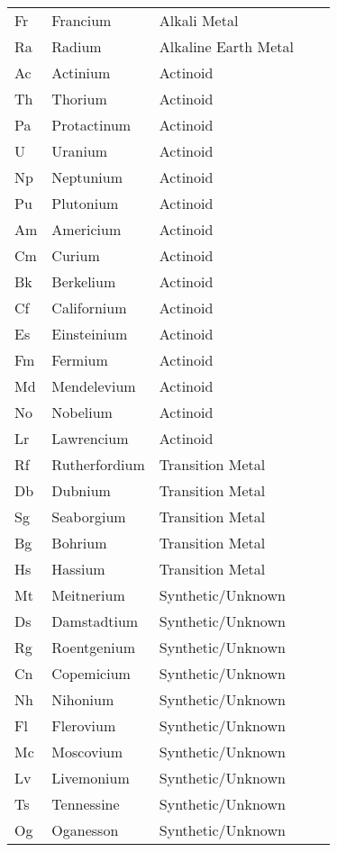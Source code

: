 \begin{center}
\begin{longtable}{|l|l|l|l|l|}
Fr 	& Francium 		& Alkali Metal 						& & \\
Ra 	& Radium 		& Alkaline Earth Metal 				& & \\
Ac 	& Actinium 		& Actinoid 							& & \\
Th 	& Thorium 		& Actinoid 							& & \\
Pa 	& Protactinum	& Actinoid 							& & \\
U 	& Uranium 		& Actinoid 							& & \\
Np 	& Neptunium 	& Actinoid 							& & \\
Pu 	& Plutonium 	& Actinoid 							& & \\
Am 	& Americium 	& Actinoid 							& & \\
Cm 	& Curium 		& Actinoid 							& & \\
Bk 	& Berkelium 	& Actinoid 							& & \\
Cf 	& Californium	& Actinoid 							& & \\
Es 	& Einsteinium	& Actinoid 							& & \\
Fm 	& Fermium 		& Actinoid 							& & \\
Md 	& Mendelevium	& Actinoid 							& & \\
No 	& Nobelium  	& Actinoid 							& & \\
Lr 	& Lawrencium 	& Actinoid 							& & \\
Rf 	& Rutherfordium & Transition Metal 					& & \\
Db 	& Dubnium 		& Transition Metal 					& & \\
Sg 	& Seaborgium 	& Transition Metal 					& & \\
Bg 	& Bohrium 		& Transition Metal 					& & \\
Hs 	& Hassium 		& Transition Metal 					& & \\
Mt 	& Meitnerium 	& Synthetic/Unknown 				& & \\
Ds 	& Damstadtium 	& Synthetic/Unknown 				& & \\
Rg 	& Roentgenium 	& Synthetic/Unknown 				& & \\
Cn 	& Copemicium 	& Synthetic/Unknown 				& & \\
Nh 	& Nihonium 		& Synthetic/Unknown 				& & \\
Fl 	& Flerovium 	& Synthetic/Unknown 				& & \\
Mc 	& Moscovium 	& Synthetic/Unknown 				& & \\
Lv 	& Livemonium 	& Synthetic/Unknown 				& & \\
Ts 	& Tennessine 	& Synthetic/Unknown 				& & \\
Og 	& Oganesson 	& Synthetic/Unknown					& & 
\end{longtable}
\end{center}

